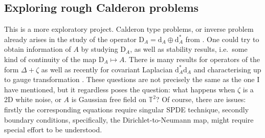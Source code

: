 \documentclass[11pt]{article}
\numberwithin{equation}{section}
\theoremstyle{definition}
\theoremstyle{remark}
\newcommand{\diff}{\mathrm{d}}
\newcommand{\1}{\mathbf 1}
\newcommand{\<}{\langle}
\renewcommand{\>}{\rangle}
\newcommand{\rmD}{\mathrm{D}}
\begin{document}
\subsection{Exploring rough Calderon problems}
This is a more exploratory project. Calderon type problems, or inverse problem already arises in the study of the operator $\rmD_A=\diff_A\oplus\diff_A^*$ from . One could try to obtain information of $A$ by studying $\rmD_A$, as well as stability results, i.e.\ some kind of continuity of the map $\rmD_A\mapsto A$. There is many results for operators of the form $\Delta+\zeta$ as well as recently for covariant Laplacian $\diff_A^*\diff_A$ and characterising up to gauge transformation \cite{Cekic20}. These questions are not precisely the same as the one I have mentioned, but it regardless poses the question: what happens when $\zeta$ is a 2D white noise, or $A$ is Gaussian free field on $\mathbb T^2$? Of course, there are issues: firstly the corresponding equations require singular SPDE technique, secondly boundary conditions, specifically, the Dirichlet-to-Neumann map, might require special effort to be understood. 












\end{document}
